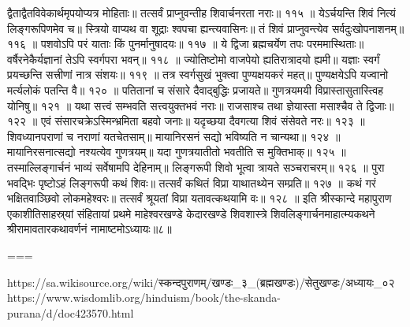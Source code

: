 द्वैताद्वैतविवेकार्थमृपयोप्यत्र मोहिताः॥
तत्सर्वं प्राप्नुवन्तीह शिवार्चनरता नराः॥ ११५ ॥
येऽर्चयन्ति शिवं नित्यं लिङ्गरूपिणमेव च॥
स्त्रियो वाप्यथ वा शूद्राः श्वपचा ह्यन्त्यवासिनः॥
तं शिवं प्राप्नुवन्त्येव सर्वदुःखोपनाशनम्॥ ११६ ॥
पशवोऽपि परं याताः किं पुनर्मानुषादयः॥ ११७ ॥
ये द्विजा ब्रह्मचर्येण तपः परममास्थिताः॥
वर्षैरनेकैर्यज्ञानां तेऽपि स्वर्गपरा भवन्॥ ११८ ॥
ज्योतिष्टोमो वाजपेयो ह्यतिरात्रादयो ह्यमी॥
यज्ञाः स्वर्गं प्रयच्छन्ति सत्त्रीणां नात्र संशयः॥ ११९ ॥
तत्र स्वर्गसुखं भुक्त्वा पुण्यक्षयकरं महत्॥
पुण्यक्षयेऽपि यज्वानो मर्त्यलोकं पतन्ति वै॥ १२० ॥
पतितानां च संसारे दैवाद्बुद्धिः प्रजायते॥
गुणत्रयमयी विप्रास्तासुतास्त्विह योनिषु॥ १२१ ॥
यथा सत्त्वं सम्भवति सत्त्वयुक्तभवं नराः॥
राजसाश्च तथा ज्ञेयास्ता मसाश्चैव ते द्विजाः॥ १२२ ॥
एवं संसारचक्रेऽस्मिन्भ्रमिता बहवो जनाः॥
यदृच्छया दैवगत्या शिवं संसेवते नरः॥ १२३ ॥
शिवध्यानपराणां च नराणां यतचेतसाम्॥
मायानिरसनं सद्यो भविष्यति न चान्यथा॥ १२४ ॥
मायानिरसनात्सद्यो नश्यत्येव गुणत्रयम्॥
यदा गुणत्रयातीतो भवतीति स मुक्तिभाक्॥ १२५ ॥
तस्माल्लिङ्गार्चनं भाव्यं सर्वेषामपि देहिनाम्॥
लिङ्गरूपी शिवो भूत्वा त्रायते सञ्चराचरम्॥ १२६ ॥
पुरा भवद्भिः पृष्टोऽहं लिङ्गरूपी कथं शिवः॥
तत्सर्वं कथितं विप्रा याथातथ्येन सम्प्रति॥ १२७ ॥
कथं गरं भक्षितवाञ्छिवो लोकमहेश्वरः॥
तत्सर्वं श्रूयतां विप्रा यतावत्कथयामि वः॥ १२८ ॥
इति श्रीस्कान्दे महापुराण एकाशीतिसाहस्र्यां संहितायां प्रथमे माहेश्वरखण्डे केदारखण्डे शिवशास्त्रे शिवलिङ्गार्चनमाहात्म्यकथने श्रीरामावतारकथावर्णनं नामाष्टमोऽध्यायः॥८॥


===

https://sa.wikisource.org/wiki/स्कन्दपुराणम्/खण्डः_३_(ब्रह्मखण्डः)/सेतुखण्डः/अध्यायः_०२
https://www.wisdomlib.org/hinduism/book/the-skanda-purana/d/doc423570.html


